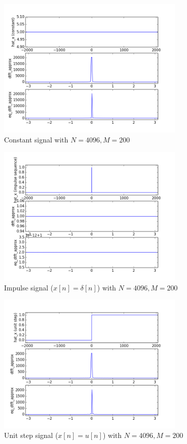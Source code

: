\begin{figure}[htbp]
	\centering
	\includegraphics[width=0.8\textwidth]{images/p6-2-200}
	\caption{Constant signal with $N=4096, M=200$}
	\label{fig:p6-2-200}
\end{figure}

\begin{figure}[htbp]
	\centering
	\includegraphics[width=0.8\textwidth]{images/p6-3-200}
	\caption{Impulse signal ($x[n] = \delta[n]$) with $N=4096, M=200$}
	\label{fig:p6-3-200}
\end{figure}

\begin{figure}[htbp]
	\centering
	\includegraphics[width=0.8\textwidth]{images/p6-4-200}
	\caption{Unit step signal ($x[n]=u[n]$) with $N=4096, M=200$}
	\label{fig:p6-4-200}
\end{figure}

